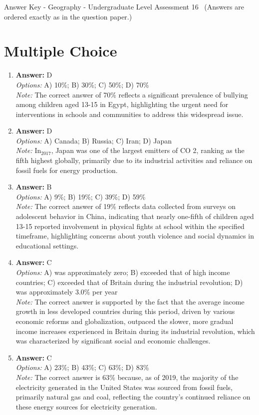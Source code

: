 \documentclass[12pt]{article}
\begin{document}
\begin{center}
Answer Key - Geography - Undergraduate Level Assessment 16 \
\small (Answers are ordered exactly as in the question paper.)
\end{center}

\section*{Multiple Choice}
\begin{enumerate}[label=\arabic*.]
\item \textbf{Answer:} D
\\ \textit{Options:} A) 10\%; B) 30\%; C) 50\%; D) 70\%
\\ \textit{Note:} The correct answer of 70\% reflects a significant prevalence of bullying among children aged 13-15 in Egypt, highlighting the urgent need for interventions in schools and communities to address this widespread issue.
\item \textbf{Answer:} D
\\ \textit{Options:} A) Canada; B) Russia; C) Iran; D) Japan
\\ \textit{Note:} In$_{2017}$, Japan was one of the largest emitters of CO 2, ranking as the fifth highest globally, primarily due to its industrial activities and reliance on fossil fuels for energy production.
\item \textbf{Answer:} B
\\ \textit{Options:} A) 9\%; B) 19\%; C) 39\%; D) 59\%
\\ \textit{Note:} The correct answer of 19\% reflects data collected from surveys on adolescent behavior in China, indicating that nearly one-fifth of children aged 13-15 reported involvement in physical fights at school within the specified timeframe, highlighting concerns about youth violence and social dynamics in educational settings.
\item \textbf{Answer:} C
\\ \textit{Options:} A) was approximately zero; B) exceeded that of high income countries; C) exceeded that of Britain during the industrial revolution; D) was approximately 3.0\% per year
\\ \textit{Note:} The correct answer is supported by the fact that the average income growth in less developed countries during this period, driven by various economic reforms and globalization, outpaced the slower, more gradual income increases experienced in Britain during its industrial revolution, which was characterized by significant social and economic challenges.
\item \textbf{Answer:} C
\\ \textit{Options:} A) 23\%; B) 43\%; C) 63\%; D) 83\%
\\ \textit{Note:} The correct answer is 63\% because, as of 2019, the majority of the electricity generated in the United States was sourced from fossil fuels, primarily natural gas and coal, reflecting the country's continued reliance on these energy sources for electricity generation.
\end{enumerate}
\end{document}
